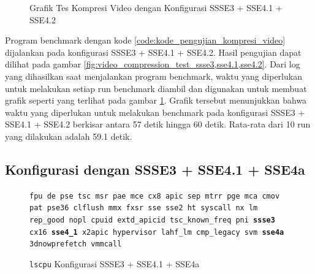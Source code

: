 \begin{figure}
    \centering
    \caption{Grafik Tes Kompresi Video dengan Konfigurasi SSSE3 + SSE4.1 + SSE4.2}
    \label{fig:video_compression_test_ssse3,sse4.1,sse4.2_graph}
\end{figure}

Program benchmark dengan kode \ref{code:kode_pengujian_kompresi_video} dijalankan pada konfigurasi SSSE3 + SSE4.1 + SSE4.2. Hasil pengujian dapat dilihat pada gambar \ref{fig:video_compression_test_ssse3,sse4.1,sse4.2}. Dari log yang dihasilkan saat menjalankan program benchmark, waktu yang diperlukan untuk melakukan setiap run benchmark diambil dan digunakan untuk membuat grafik seperti yang terlihat pada gambar \ref{fig:video_compression_test_ssse3,sse4.1,sse4.2_graph}. Grafik tersebut menunjukkan bahwa waktu yang diperlukan untuk melakukan benchmark pada konfigurasi SSSE3 + SSE4.1 + SSE4.2 berkisar antara 57 detik hingga 60 detik. Rata-rata dari 10 run yang dilakukan adalah 59.1 detik.

\subsection{Konfigurasi dengan SSSE3 + SSE4.1 + SSE4a}
\begin{figure}
    \texttt{fpu de pse tsc msr pae mce cx8 apic sep mtrr pge mca cmov pat pse36 clflush mmx fxsr sse sse2 ht syscall nx lm rep\_good nopl cpuid extd\_apicid tsc\_known\_freq pni \textbf{ssse3} cx16 \textbf{sse4\_1} x2apic hypervisor lahf\_lm cmp\_legacy svm \textbf{sse4a} 3dnowprefetch vmmcall}
    \caption{\texttt{lscpu} Konfigurasi SSSE3 + SSE4.1 + SSE4a}
    \label{fig:lscpu_video_compression_test_ssse3,sse4.1,sse4a}
\end{figure}


